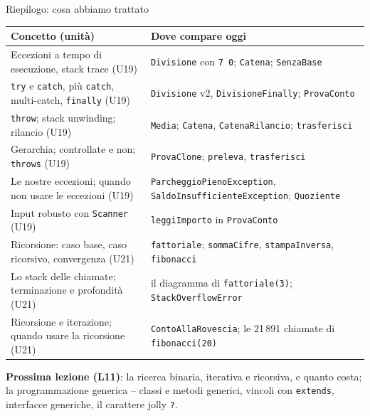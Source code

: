\documentclass[10pt,aspectratio=169]{beamer}
\begin{document}
\begin{frame}{Riepilogo: cosa abbiamo trattato}
\footnotesize
\begin{center}
\renewcommand{\arraystretch}{1.1}
\scriptsize
\begin{tabular}{|>{\raggedright\arraybackslash}p{6.4cm}|>{\raggedright\arraybackslash}p{7.4cm}|}
\hline
\textbf{Concetto (unità)} & \textbf{Dove compare oggi} \\
\hline
Eccezioni a tempo di esecuzione, stack trace (U19) & \texttt{Divisione} con \texttt{7 0}; \texttt{Catena}; \texttt{SenzaBase} \\
\hline
\texttt{try} e \texttt{catch}, più \texttt{catch}, multi-catch, \texttt{finally} (U19) & \texttt{Divisione} v2, \texttt{DivisioneFinally}; \texttt{ProvaConto} \\
\hline
\texttt{throw}; stack unwinding; rilancio (U19) & \texttt{Media}; \texttt{Catena}, \texttt{CatenaRilancio}; \texttt{trasferisci} \\
\hline
Gerarchia; controllate e non; \texttt{throws} (U19) & \texttt{ProvaClone}; \texttt{preleva}, \texttt{trasferisci} \\
\hline
Le nostre eccezioni; quando non usare le eccezioni (U19) & \texttt{ParcheggioPienoException}, \texttt{SaldoInsufficienteException}; \texttt{Quoziente} \\
\hline
Input robusto con \texttt{Scanner} (U19) & \texttt{leggiImporto} in \texttt{ProvaConto} \\
\hline
Ricorsione: caso base, caso ricorsivo, convergenza (U21) & \texttt{fattoriale}; \texttt{sommaCifre}, \texttt{stampaInversa}, \texttt{fibonacci} \\
\hline
Lo stack delle chiamate; terminazione e profondità (U21) & il diagramma di \texttt{fattoriale(3)}; \texttt{StackOverflowError} \\
\hline
Ricorsione e iterazione; quando usare la ricorsione (U21) & \texttt{ContoAllaRovescia}; le 21\,891 chiamate di \texttt{fibonacci(20)} \\
\hline
\end{tabular}
\end{center}

\vspace{0.1cm}
\textbf{Prossima lezione (L11)}: la ricerca binaria, iterativa e ricorsiva, e quanto costa; la programmazione generica -- classi e metodi generici, vincoli con \texttt{extends}, interfacce generiche, il carattere jolly \texttt{?}.
\end{frame}
\end{document}
